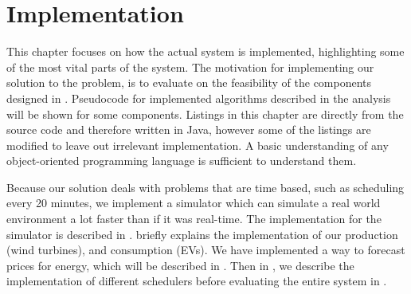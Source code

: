\chapter{Implementation}\label{chap:implementation}
This chapter focuses on how the actual system is implemented, highlighting some of the most vital parts of the system. The motivation for implementing our solution to the problem, is to evaluate on the feasibility of the components designed in . Pseudocode for implemented algorithms described in the analysis will be shown for some components. Listings in this chapter are directly from the source code and therefore written in Java, however some of the listings are modified to leave out irrelevant implementation. A basic understanding of any object-oriented programming language is sufficient to understand them. 

Because our solution deals with problems that are time based, such as scheduling every 20 minutes, we implement a simulator which can simulate a real world environment a lot faster than if it was real-time. The implementation for the simulator is described in .  briefly explains the implementation of our production (wind turbines), and consumption (EVs). We have implemented a way to forecast prices for energy, which will be described in . Then in , we describe the implementation of different schedulers before evaluating the entire system in .

\lipsum